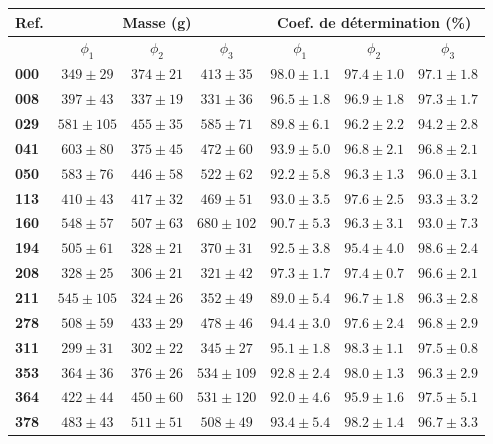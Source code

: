 \begin{appendices}
	\begin{tabular}{|l|c|c|c|c|c|c|}
		\hline
		\multicolumn{1}{|c|}{Ref.}&\multicolumn{3}{c|}{Masse (\si{\gram})} & \multicolumn{3}{c|}{Coef. de détermination (\si{\percent})} \\[2mm]
		\hline
		&\textbf{$\phi_1$}&\textbf{$\phi_2$}&\textbf{$\phi_3$}&\textbf{$\phi_1$}&\textbf{$\phi_2$}&\textbf{$\phi_3$}\\\hline
		\textbf{000}&$349 \pm 29$&$374 \pm 21$&$413 \pm 35$&$98.0 \pm 1.1$&$97.4 \pm 1.0$&$97.1 \pm 1.8$\\\hline
		\textbf{008}&$397 \pm 43$&$337 \pm 19$&$331 \pm 36$&$96.5 \pm 1.8$&$96.9 \pm 1.8$&$97.3 \pm 1.7$\\\hline
		\textbf{029}&$581 \pm 105$&$455 \pm 35$&$585 \pm 71$&$89.8 \pm 6.1$&$96.2 \pm 2.2$&$94.2 \pm 2.8$\\\hline
		\textbf{041}&$603 \pm 80$&$375 \pm 45$&$472 \pm 60$&$93.9 \pm 5.0$&$96.8 \pm 2.1$&$96.8 \pm 2.1$\\\hline
		\textbf{050}&$583 \pm 76$&$446 \pm 58$&$522 \pm 62$&$92.2 \pm 5.8$&$96.3 \pm 1.3$&$96.0 \pm 3.1$\\\hline
		\textbf{113}&$410 \pm 43$&$417 \pm 32$&$469 \pm 51$&$93.0 \pm 3.5$&$97.6 \pm 2.5$&$93.3 \pm 3.2$\\\hline
		\textbf{160}&$548 \pm 57$&$507 \pm 63$&$680 \pm 102$&$90.7 \pm 5.3$&$96.3 \pm 3.1$&$93.0 \pm 7.3$\\\hline
		\textbf{194}&$505 \pm 61$&$328 \pm 21$&$370 \pm 31$&$92.5 \pm 3.8$&$95.4 \pm 4.0$&$98.6 \pm 2.4$\\\hline
		\textbf{208}&$328 \pm 25$&$306 \pm 21$&$321 \pm 42$&$97.3 \pm 1.7$&$97.4 \pm 0.7$&$96.6 \pm 2.1$\\\hline
		\textbf{211}&$545 \pm 105$&$324 \pm 26$&$352 \pm 49$&$89.0 \pm 5.4$&$96.7 \pm 1.8$&$96.3 \pm 2.8$\\\hline
		\textbf{278}&$508 \pm 59$&$433 \pm 29$&$478 \pm 46$&$94.4 \pm 3.0$&$97.6 \pm 2.4$&$96.8 \pm 2.9$\\\hline
		\textbf{311}&$299 \pm 31$&$302 \pm 22$&$345 \pm 27$&$95.1 \pm 1.8$&$98.3 \pm 1.1$&$97.5 \pm 0.8$\\\hline
		\textbf{353}&$364 \pm 36$&$376 \pm 26$&$534 \pm 109$&$92.8 \pm 2.4$&$98.0 \pm 1.3$&$96.3 \pm 2.9$\\\hline
		\textbf{364}&$422 \pm 44$&$450 \pm 60$&$531 \pm 120$&$92.0 \pm 4.6$&$95.9 \pm 1.6$&$97.5 \pm 5.1$\\\hline
		\textbf{378}&$483 \pm 43$&$511 \pm 51$&$508 \pm 49$&$93.4 \pm 5.4$&$98.2 \pm 1.4$&$96.7 \pm 3.3$\\\hline

\end{tabular}
\end{appendices}
